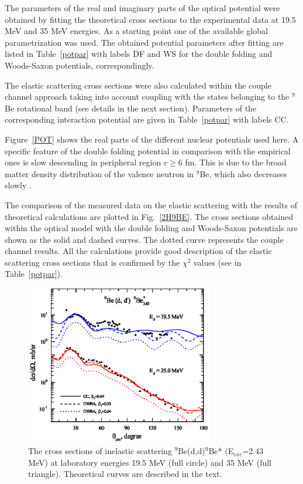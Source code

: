 \documentclass[10pt]{iopart}
\begin{document}
The parameters of the real and imaginary parts of the optical potential were obtained by fitting the theoretical cross sections to the experimental data at 19.5 MeV and 35 MeV energies. As a starting point one of the available global parametrization \cite{globalDeuteron} was used. The obtained potential parameters after fitting are listed in Table~\ref{potpar} with labels DF and WS for the double folding and Woods-Saxon potentials, correspondingly.

The elastic scattering cross sections were also calculated within the couple channel approach taking into account coupling with the states belonging to the ${}^9$Be rotational band (see details in the next section). Parameters of the corresponding interaction potential are given in Table~\ref{potpar} with labels CC.

Figure~\ref{POT} shows the real parts of the different nuclear potentials used here. A specific feature of the double folding potential in comparison with the empirical ones is slow descending in peripheral region $r \geq 6$ fm. This is due to the broad matter density distribution of the valence neutron in ${}^9$Be, which also decreases slowly \cite{urazbekov2016}.

The comparison of the measured data on the elastic scattering with the results of theoretical calculations are plotted in Fig.~\ref{2H9BE}. The cross sections obtained within the optical model with the double folding and Woods-Saxon potentials are shown as the solid and dashed curves. The dotted curve represents the couple channel results. All the calculations provide good description of the elastic scattering cross sections that is confirmed by the $\chi^2$ values (see in Table~\ref{potpar}).

\begin{figure}[tp]
\centering
\includegraphics[width=8.2cm]{2H9BE2430MEV.eps}
\caption{\label{2H9BE2430MEV}The cross sections of inelastic scattering ${}^9$Be(d,d)$^9$Be* (E$_{exc}$=2.43 MeV) at laboratory energies 19.5 MeV (full circle) and 35 MeV (full triangle). Theoretical curves are described in the text.}
\end{figure}
\end{document}
